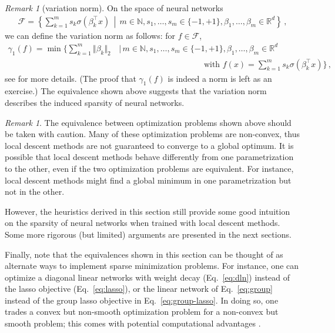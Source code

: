 \documentclass[11pt,reqno]{article}
\newcommand{\N}{\mathbb{N}}
\newcommand{\R}{\mathbb{R}}
\newcommand{\cF}{\mathcal{F}}
\numberwithin{equation}{section}
\theoremstyle{plain}
\theoremstyle{definition}
\theoremstyle{remark}
\newtheorem{remark}[assumption]{Remark}
\begin{document}
\begin{remark}[variation norm]
	On the space of neural networks 
	\begin{align*}
		\cF = \left\{\sum_{k=1}^{m} s_k \sigma(\beta_k^\top x) \, \middle\vert \, m \in \N, s_1, \dots , s_m \in \{-1, +1\}, \beta_1, \dots, \beta_m \in \R^d \right\} \, , 
	\end{align*}
	we can define the variation norm as follows: for $f \in \cF$, 
	\begin{align*}
		\gamma_1(f) = \min\Bigg\{ \sum_{k=1}^{m} \Vert \beta_k \Vert_2 \, &\Bigg\vert \, m \in \N, s_1, \dots , s_m \in \{-1, +1\}, \beta_1, \dots, \beta_m \in \R^d \\
		&\qquad\qquad\qquad\qquad\qquad\text{ with }f(x) = \sum_{k=1}^{m} s_k \sigma(\beta_k^\top x)\Bigg\} \, ,
	\end{align*}
	see \cite[Section 9.3]{bach2024learning} for more details. (The proof that $\gamma_1(f)$ is indeed a norm is left as an exercise.) The equivalence shown above suggests that the variation norm describes the induced sparsity of neural networks. 
\end{remark}

\begin{remark}
	The equivalence between optimization problems shown above should be taken with caution. Many of these optimization problems are non-convex, thus local descent methods are not guaranteed to converge to a global optimum. It is possible that local descent methods behave differently from one parametrization to the other, even if the two optimization problems are equivalent. For instance, local descent methods might find a global minimum in one parametrization but not in the other.
	
	However, the heuristics derived in this section still provide some good intuition on the sparsity of neural networks when trained with local descent methods. Some more rigorous (but limited) arguments are presented in the next sections.

	Finally, note that the equivalences shown in this section can be thought of as alternate ways to implement sparse minimization problems. For instance, one can optimize a diagonal linear networks with weight decay (Eq.~\eqref{eq:dln}) instead of the lasso objective (Eq.~\eqref{eq:lasso}), or the linear network of Eq.~\eqref{eq:group} instead of the group lasso objective in Eq.~\eqref{eq:group-lasso}. In doing so, one trades a convex but non-smooth optimization problem for a non-convex but smooth problem; this comes with potential computational advantages \cite{poon2023smooth}.
\end{remark}
\end{document}
